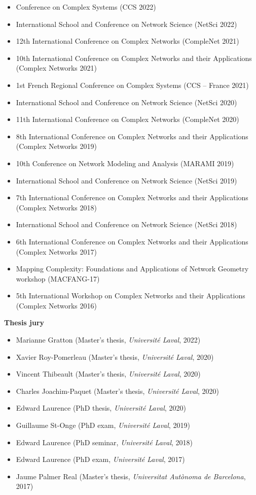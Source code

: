 \documentclass[11pt]{article}
\begin{document}
\begin{itemize}
  \item Conference on Complex Systems (CCS 2022)
  \item International School and Conference on Network Science (NetSci 2022)
  \item 12th International Conference on Complex Networks (CompleNet 2021)
  \item 10th International Conference on Complex Networks and their Applications (Complex Networks 2021)
  \item 1st French Regional Conference on Complex Systems (CCS -- France 2021)
  \item International School and Conference on Network Science (NetSci 2020)
  \item 11th International Conference on Complex Networks (CompleNet 2020)
  \item 8th International Conference on Complex Networks and their Applications (Complex Networks 2019)
  \item 10th Conference on Network Modeling and Analysis (MARAMI 2019)
  \item International School and Conference on Network Science (NetSci 2019)
  \item 7th International Conference on Complex Networks and their Applications (Complex Networks 2018)
  \item International School and Conference on Network Science (NetSci 2018)
  \item 6th International Conference on Complex Networks and their Applications (Complex Networks 2017)
  \item Mapping Complexity: Foundations and Applications of Network Geometry workshop (MACFANG-17)
  \item 5th International Workshop on Complex Networks and their Applications (Complex Networks 2016)
\end{itemize}
%
%
%
\textbf{Thesis jury}
%
\begin{itemize}
  \item Marianne Gratton (Master's thesis, \textit{Universit\'e Laval}, 2022)
  \item Xavier Roy-Pomerleau (Master's thesis, \textit{Universit\'e Laval}, 2020)
  \item Vincent Thibeault (Master's thesis, \textit{Universit\'e Laval}, 2020)
  \item Charles Joachim-Paquet (Master's thesis, \textit{Universit\'e Laval}, 2020)
  \item Edward Laurence (PhD thesis, \textit{Universit\'e Laval}, 2020)
  \item Guillaume St-Onge (PhD exam, \textit{Universit\'e Laval}, 2019)
  \item Edward Laurence (PhD seminar, \textit{Universit\'e Laval}, 2018)
  \item Edward Laurence (PhD exam, \textit{Universit\'e Laval}, 2017)
  \item Jaume Palmer Real (Master's thesis, \textit{Universitat Aut\`onoma de Barcelona}, 2017)
\end{itemize}
\end{document}
